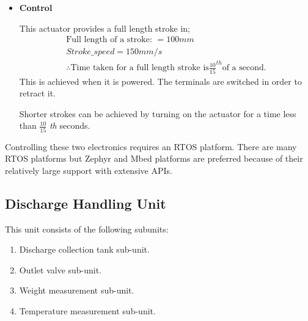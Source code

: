 \begin{enumerate}
\begin{itemize}
        \item \textbf{Control}
        \par
        This actuator provides a full length stroke in;
        \begin{align*}
            \text{Full length of a stroke: } = 100mm\\
            Stroke\_speed = 150mm/s\\
            \therefore \text{Time taken for a full length stroke is} \frac{10}{15}^{th}  \text{of a second.}
        \end{align*}
        This is achieved when it is powered. The terminals are switched in order to retract it.
        \par
        Shorter strokes can be achieved by turning on the actuator for a time less than $\frac{10}{15}$ \textit{th} seconds.
    \end{itemize}
\end{enumerate}
Controlling these two electronics requires an RTOS platform. There are many RTOS platforms but Zephyr and Mbed platforms are preferred because of their relatively large support with extensive APIs. 
\clearpage
\subsection{Discharge Handling Unit}
This unit consists of the following subunits:
\begin{enumerate}
    \item Discharge collection tank sub-unit.
    \item Outlet valve sub-unit.
    \item Weight measurement sub-unit.
    \item Temperature measurement sub-unit.
\end{enumerate}

